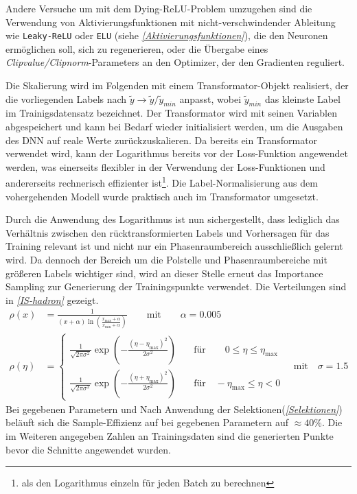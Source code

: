 Andere Versuche um mit dem Dying-ReLU-Problem umzugehen sind die Verwendung von Aktivierungsfunktionen mit nicht-verschwindender Ableitung wie \texttt{Leaky-ReLU} oder \texttt{ELU} (siehe \textit{\autoref{Aktivierungsfunktionen}}), die den Neuronen ermöglichen soll, sich zu regenerieren, oder die Übergabe eines \textit{Clipvalue/Clipnorm}-Parameters an den Optimizer, der den Gradienten reguliert.

Die Skalierung wird im Folgenden mit einem Transformator-Objekt realisiert, der die vorliegenden Labels nach $\tilde{y} \rightarrow \tilde{y}/{\tilde{y}_{min}}$
anpasst, wobei $\tilde{y}_{min}$ das kleinste Label im Trainigsdatensatz bezeichnet. Der Transformator wird mit seinen Variablen abgespeichert und kann bei Bedarf wieder initialisiert werden, um die Ausgaben des DNN auf reale Werte zurückzuskalieren. 
Da bereits ein Transformator verwendet wird, kann der Logarithmus bereits vor der Loss-Funktion angewendet werden, was einerseits flexibler in der Verwendung der Loss-Funktionen und andererseits rechnerisch effizienter ist\footnote{als den Logarithmus einzeln für jeden Batch zu berechnen}. Die Label-Normalisierung aus dem vohergehenden Modell wurde praktisch auch im Transformator umgesetzt.

Durch die Anwendung des Logarithmus ist nun sichergestellt, dass lediglich das Verhältnis zwischen den rücktransformierten Labels und Vorhersagen für das Training relevant ist und nicht nur ein Phasenraumbereich ausschließlich gelernt wird. Da dennoch der Bereich um die Polstelle und Phasenraumbereiche mit größeren Labels wichtiger sind, wird an dieser Stelle erneut das Importance Sampling zur Generierung der Trainingspunkte verwendet. Die Verteilungen sind in \textit{\autoref{IS-hadron}} gezeigt.  
\begin{equation}
\begin{aligned}
\rho(x) &= \frac{1}{(x + \alpha)\ln(\frac{x_{\text{max}} + \alpha}{x_{\text{min}}+ \alpha})} \qquad \text{mit} \qquad \alpha = 0.005 \\
\rho(\eta) &= \begin{cases}
\frac{1}{\sqrt{2\pi \sigma^2}} \exp(-\frac{(\eta - \eta_{\text{max}})^2}{2\sigma^2}) \quad & \text{für} \qquad 0 \leq \eta \leq \eta_{\text{max}}\\
\frac{1}{\sqrt{2\pi \sigma^2}} \exp(-\frac{(\eta + \eta_{\text{max}})^2}{2\sigma^2}) \quad & \text{für} \quad -\eta_{\text{max}} \leq \eta < 0
\end{cases} \quad \text{mit} \quad \sigma = 1.5
\end{aligned}
\label{IS-hadron}
\end{equation}
Bei gegebenen Parametern und Nach Anwendung der Selektionen(\textit{\autoref{Selektionen}}) beläuft sich die Sample-Effizienz auf bei gegebenen Parametern auf $\approx 40\%$. Die im Weiteren angegeben Zahlen an Trainingsdaten sind die generierten Punkte bevor die Schnitte angewendet wurden.

